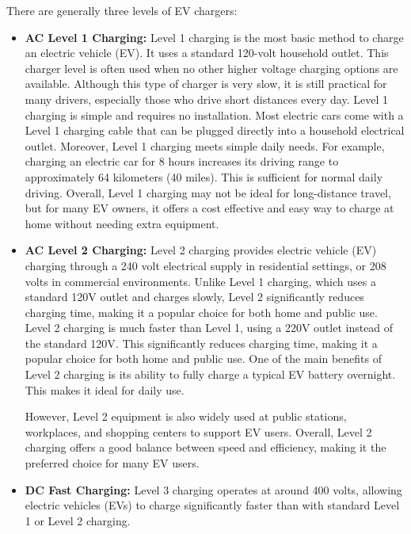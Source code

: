 There are generally three levels of EV chargers:
\begin{itemize}
    \item \textbf{AC Level 1 Charging:} Level 1 charging is the most basic method to charge an electric vehicle (EV). It uses a standard 120-volt household outlet. This charger level is often used when no other higher voltage charging options are available. Although this type of charger is very slow, it is still practical for many drivers, especially those who drive short distances every day. Level 1 charging is simple and requires no installation. Most electric cars come with a Level 1 charging cable that can be plugged directly into a household electrical outlet.
    Moreover, Level 1 charging meets simple daily needs. For example, charging an electric car for 8 hours increases its driving range to approximately 64 kilometers (40 miles). This is sufficient for normal daily driving. Overall, Level 1 charging may not be ideal for long-distance travel, but for many EV owners, it offers a cost effective and easy way to charge at home without needing extra equipment\cite{Alternative Fuels Data Center}.

        
    \item \textbf{AC Level 2 Charging:} Level 2 charging provides electric vehicle (EV) charging through a 240 volt electrical supply in residential settings, or 208 volts in commercial environments\cite{Alternative Fuels Data Center}. Unlike Level 1 charging, which uses a standard 120V outlet and charges slowly, Level 2 significantly reduces charging time, making it a popular choice for both home and public use. Level 2 charging is much faster than Level 1, using a 220V outlet instead of the standard 120V\cite{Alternative Fuels Data Center}. This significantly reduces charging time, making it a popular choice for both home and public use. One of the main benefits of Level 2 charging is its ability to fully charge a typical EV battery overnight. This makes it ideal for daily use.

    However, Level 2 equipment is also widely used at public stations, workplaces, and shopping centers to support EV users. Overall, Level 2 charging offers a good balance between speed and efficiency, making it the preferred choice for many EV users.
    
    \item \textbf{DC Fast Charging:} Level 3 charging operates at around 400 volts, allowing electric vehicles (EVs) to charge significantly faster than with standard Level 1 or Level 2 charging\cite{DC Fast Chargers for Electric Vehicles}.   
    

\end{itemize}
